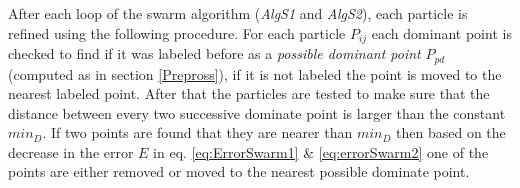 \documentclass{article}%
\begin{document}
After each loop of the swarm algorithm (\textsl{AlgS1} and \textsl{AlgS2}), each particle is refined using the following procedure. For each particle $P_{ij}$ %
each dominant point is checked to find if it was labeled before as a \textit{possible dominant point} $P_{pd}$ (computed as in section \ref{Prepross}), if it is not labeled the point is moved to the nearest labeled point. After that the particles are tested to make sure that the distance between every two successive dominate point is larger than the constant $min_D$. If two points are found that they are nearer than $min_D$ then based on the decrease in the error $E$ in eq. \ref{eq:ErrorSwarm1} \& \ref{eq:errorSwarm2} one of the points are either removed or moved to the nearest possible dominate point. 
\end{document}
